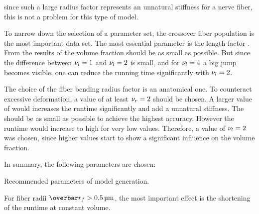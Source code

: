 since such a large radius factor represents an unnatural stiffness for a nerve fiber, this is not a problem for this type of model.
\par
%
To narrow down the selection of a parameter set, the crossover fiber population \cfbs{} is the most important data set.
The most essential parameter is the length factor \segLengthFactor{}.
From the results of the volume fraction \segLengthFactor should be as small as possible.
But since the difference between $\textnormal{$\nu_{l}$}=\SI{1}{}$ and $\textnormal{$\nu_{l}$}=\SI{2}{}$ is small, and for $\textnormal{$\nu_{l}$}=\SI{4}{}$ a big jump becomes visible, one can reduce the running time significantly with $\textnormal{$\nu_{l}$}=\SI{2}{}$.
\par
%
The choice of the fiber bending radius factor \segRadiusFactor{} is an anatomical one.
To counteract excessive deformation, a value of at least $\textnormal{$\nu_{r}$} = \SI{2}{}$ should be chosen.
A larger value of \segRadiusFactor{} would increases the runtime significantly and add a unnatural stiffness.
The \segLengthFactor{} should be as small as possible to achieve the highest accuracy.
However the runtime would increase to high for very low values.
Therefore, a value of $\textnormal{$\nu_{l}$} = \SI{2}{}$ was chosen, since higher values start to show a significant influence on the volume fraction.
\par
%
In summary, the following parameters are chosen:
%
\begin{table}[H]
%
\centering
\caption{Recommended parameters of model generation.}
\label{tab:parameterSetup}
\end{table}
%
For fiber radii $\fiberRadiusMean > \SI{0.5}{\micro\meter}$, the most important effect is the shortening of the runtime at constant volume.
